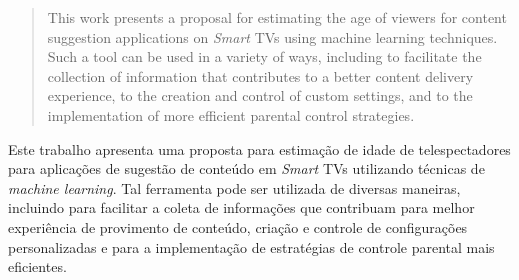 \begin{abstract}
  This work presents a proposal for estimating the age of viewers for content suggestion applications on \emph {Smart} TVs using machine learning techniques. Such a tool can be used in a variety of ways, including to facilitate the collection of information that contributes to a better content delivery experience, to the creation and control of custom settings, and to the implementation of more efficient parental control strategies.
\end{abstract}

\begin{resumo}
  Este trabalho apresenta uma proposta para estimação de idade de telespectadores para aplicações de sugestão de conteúdo em \emph{Smart} TVs utilizando técnicas de \emph{machine learning}. Tal ferramenta pode ser utilizada de diversas maneiras, incluindo para facilitar a coleta de informações que contribuam para melhor experiência de provimento de conteúdo, criação e controle de configurações personalizadas e para a implementação de estratégias de controle parental mais eficientes.
\end{resumo}
